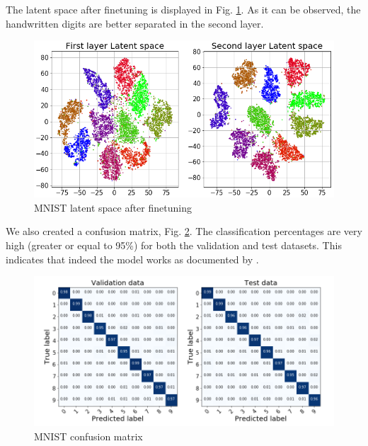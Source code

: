 \documentclass{article}
\begin{document}
The latent space after finetuning is displayed in Fig. \ref{fig:separationMNIST}. As it can be observed, the handwritten digits are better separated in the second layer.
\begin{figure}[H]
	\centering
	\includegraphics[width=1\linewidth]{latent_space_finetune_no_legend.png}  
	\caption{MNIST latent space after finetuning}
	\label{fig:separationMNIST} 
\end{figure}

We also created a confusion matrix, Fig. \ref{fig:confusionMNIST}. The classification percentages are very high (greater or equal to 95\%) for both the validation and test datasets. This indicates that indeed the model works as documented by \cite{Hosseini-Asl2016}.

\begin{figure}[H]
   \centering
	\includegraphics[width=1\linewidth]{Confusion_matrix_fine_tune_2.png}  
	\caption{MNIST confusion matrix}
	\label{fig:confusionMNIST} 
\end{figure}
\end{document}
